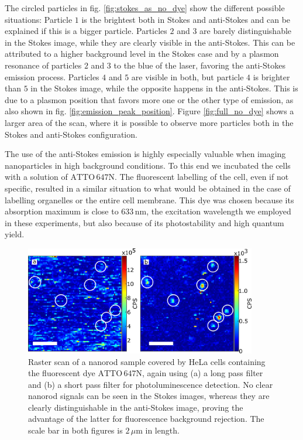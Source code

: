 \documentclass[journal=nalefd,manuscript=letter]{achemso}
\newcommand{\nm}{\ensuremath{\,\textrm{nm}}}
\newcommand{\um}{\ensuremath{\,\mu\textrm{m}}}
\newcommand{\atto}{\ensuremath{\textrm{ATTO}\,647\textrm{N}}}
\begin{document}
The circled particles in fig. \ref{fig:stokes_as_no_dye} show the different
possible situations: Particle $1$ is the brightest both in Stokes and
anti-Stokes and can be explained if this is a bigger particle.
Particles $2$ and $3$ are barely distinguishable in the Stokes image, while they
are clearly visible in the anti-Stokes. This can be attributed to a higher
background level in the Stokes case and by a plasmon resonance of particles $2$
and $3$ to the blue of the laser, favoring the anti-Stokes emission process.
Particles $4$ and $5$ are visible in both, but particle $4$ is brighter than $5$
in the Stokes image, while the opposite happens in the anti-Stokes.
This is due to a plasmon position that favors more one or the other type of
emission, as also shown in fig. \ref{fig:emission_peak_position}. Figure
\ref{fig:full_no_dye} shows a larger area of the scan, where it is possible to
observe more particles both in the Stokes and anti-Stokes configuration.

The use of the anti-Stokes emission is highly especially valuable when imaging
nanoparticles in high background conditions. To this end we incubated the cells
with a solution of $\atto$. The fluorescent labelling of the cell, even if not
specific, resulted in a similar situation to what would be obtained in the case
of labelling organelles or the entire cell membrane. This dye was chosen because
its absorption maximum is close to $633\nm$, the excitation wavelength we
employed in these experiments, but also because of its photostability and high
quantum yield.

\begin{figure}[htp] \centering
\includegraphics[width=0.9\textwidth]{Figures/05_Stokes_AS_with_dye/stokes_as_with_dye.png}
\caption{Raster scan of a nanorod sample covered by HeLa cells containing the
fluorescent dye $\atto$, again using (a) a long pass filter and (b) a short pass
filter for photoluminescence detection. No clear nanorod signals can be seen in
the Stokes images, whereas they are clearly distinguishable in the anti-Stokes
image, proving the advantage of the latter for fluorescence background
rejection. The scale bar in both figures is $2\um$ in length.}
	\label{fig:Stokes_AS_with_dye}
\end{figure}
\end{document}
